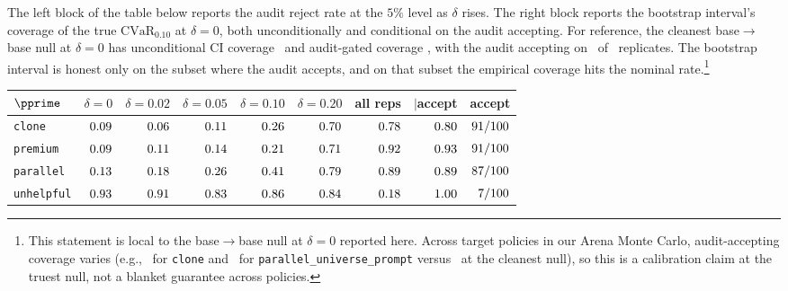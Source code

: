 \documentclass[11pt]{article}
\newcommand{\CVaR}{\mathrm{CVaR}}
\begin{document}
The left block of the table below reports the audit reject rate at the $5\%$ level as $\delta$ rises. The right block reports the bootstrap interval's coverage of the true $\CVaR_{0.10}$ at $\delta = 0$, both unconditionally and conditional on the audit accepting. For reference, the cleanest base$\to$base null at $\delta = 0$ has unconditional CI coverage \mcCovAllBase\ and audit-gated coverage \mcCovAcceptBase, with the audit accepting on \mcNAcceptBase\ of \mcNTotalBase\ replicates. The bootstrap interval is honest only on the subset where the audit accepts, and on that subset the empirical coverage hits the nominal rate.\footnote{This statement is local to the base$\to$base null at $\delta=0$ reported here. Across target policies in our Arena Monte Carlo, audit-accepting coverage varies (e.g., \mcCovAcceptClone\ for \texttt{clone} and \mcCovAcceptParallel\ for \texttt{parallel\_universe\_prompt} versus \mcCovAcceptBase\ at the cleanest null), so this is a calibration claim at the truest null, not a blanket guarantee across policies.}

\begin{table}[H]
\centering
\setlength{\tabcolsep}{4.5pt}
\begin{tabular}{lrrrrr|rrr}
\toprule
$\pprime$ & $\delta=0$ & $\delta=0.02$ & $\delta=0.05$ & $\delta=0.10$ & $\delta=0.20$ & all reps & $\mid$accept & accept \\
\midrule
\texttt{clone}     & $0.09$    & $0.06$    & $0.11$    & $0.26$    & $0.70$    & $0.78$    & $0.80$    & $91/100$ \\
\texttt{premium}   & $0.09$  & $0.11$  & $0.14$  & $0.21$  & $0.71$  & $0.92$  & $0.93$  & $91/100$ \\
\texttt{parallel}  & $0.13$ & $0.18$ & $0.26$ & $0.41$ & $0.79$ & $0.89$ & $0.89$ & $87/100$ \\
\texttt{unhelpful} & $0.93$ & $0.91$ & $0.83$ & $0.86$ & $0.84$ & $0.18$ & $1.00$ & $7/100$ \\
\bottomrule
\end{tabular}
\end{table}
\end{document}

